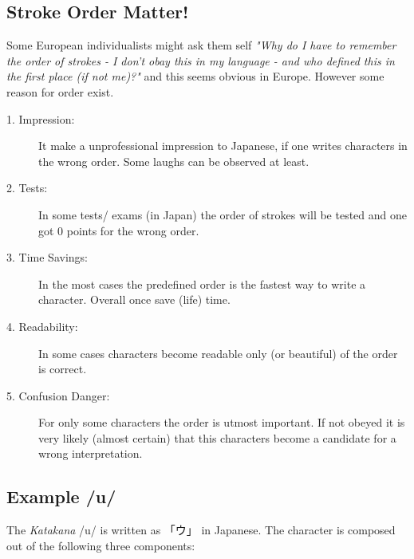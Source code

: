 \subsection{Stroke Order Matter!}
\label{sec:StrokeOrderMatter}

Some European individualists might ask them self \textit{"Why do I have to
remember the order of strokes - I don't obay this in my language - and who
defined this in the first place (if not me)?"} and this seems obvious in
Europe. However some reason for order exist. 


\begin{description}

\item[1. Impression:] It make a unprofessional impression to Japanese, if one
writes characters in the wrong order. Some laughs can be observed at least.

\item[2. Tests:]  In some tests/ exams (in Japan) the order of strokes will be
tested and one got 0 points for the wrong order. 

\item[3. Time Savings:] In the most cases the predefined order is the fastest
way to write a character. Overall once save (life) time.

\item[4. Readability:] In some cases characters become readable only (or
beautiful) of the order is correct.

\item[5. Confusion Danger:] For only some characters the order is utmost
important. If not obeyed it is very likely (almost certain) that this
characters become a candidate for a wrong interpretation. 

\end{description}
\normalsize

\newpage
\subsection{Example /u/ }
\label{subsec:ExampleU}

The \textit{Katakana} /u/ is written as {「ウ」} in Japanese. The character is
composed out of the following three components:

